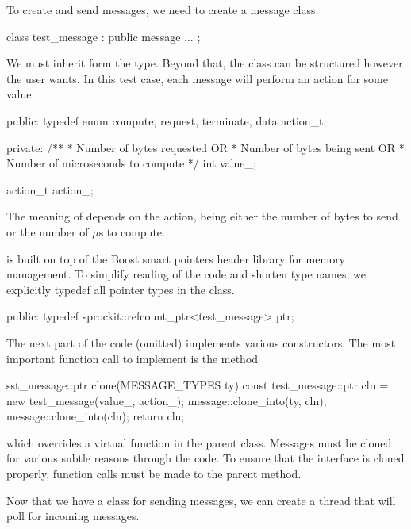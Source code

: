 To create and send messages, we need to create a message class.

\begin{CppCode}
class test_message :
    public message
{
...
};
\end{CppCode}
We must inherit form the  type.  
Beyond that, the class can be structured however the user wants.
In this test case, each message will perform an action for some value.

\begin{CppCode}
    public:
        typedef enum { compute, request, terminate, data } action_t;

    private:
        /**
        *    Number of bytes requested OR
        *    Number of bytes being sent OR
        *    Number of microseconds to compute
        */
        int value_;

        action_t action_;
\end{CppCode}
The meaning of  depends on the action, 
being either the number of bytes to send or the number of $\mu$s to compute.

\sstmacro is built on top of the Boost smart pointers header library for memory management. 
To simplify reading of the code and shorten type names, we explicitly typedef all pointer types in the class.

\begin{CppCode}
    public:
        typedef sprockit::refcount_ptr<test_message> ptr;
\end{CppCode}

The next part of the code (omitted) implements various constructors.  
The most important function call to implement is the  method

\begin{CppCode}
        sst_message::ptr
        clone(MESSAGE_TYPES ty) const
        {
            test_message::ptr cln = new test_message(value_, action_);
            message::clone_into(ty, cln);
            message::clone_into(cln);
            return cln;
        }
\end{CppCode}
which overrides a virtual function in the parent class.  
Messages must be cloned for various subtle reasons through the code.
To ensure that the  interface is cloned properly,
function calls must be made to the parent  method.

Now that we have a class for sending messages, we can create a thread that will poll for incoming messages.

